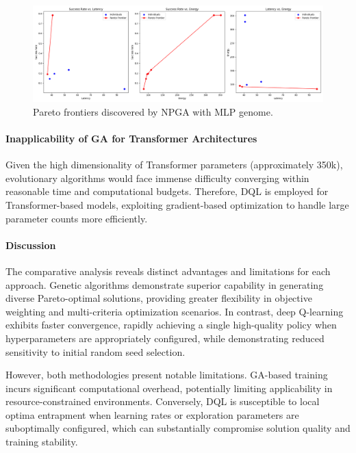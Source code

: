 \documentclass[preprint,3p,authoryear]{elsarticle}
\begin{document}
\begin{figure}[H]
    \centering
    \includegraphics[width=0.9\linewidth]{figs/pareto_frontiers_npga.png}
    \caption{Pareto frontiers discovered by NPGA with MLP genome.}
    \label{fig:npga-pareto-frontiers}
\end{figure}

\paragraph{Inapplicability of GA for Transformer Architectures}
Given the high dimensionality of Transformer parameters (approximately 350k), evolutionary algorithms would face immense difficulty converging within reasonable time and computational budgets. Therefore, DQL is employed for Transformer-based models, exploiting gradient-based optimization to handle large parameter counts more efficiently.

\paragraph{Discussion}
The comparative analysis reveals distinct advantages and limitations for each approach. Genetic algorithms demonstrate superior capability in generating diverse Pareto-optimal solutions, providing greater flexibility in objective weighting and multi-criteria optimization scenarios. In contrast, deep Q-learning exhibits faster convergence, rapidly achieving a single high-quality policy when hyperparameters are appropriately configured, while demonstrating reduced sensitivity to initial random seed selection.

However, both methodologies present notable limitations. GA-based training incurs significant computational overhead, potentially limiting applicability in resource-constrained environments. Conversely, DQL is susceptible to local optima entrapment when learning rates or exploration parameters are suboptimally configured, which can substantially compromise solution quality and training stability.

\end{document}
